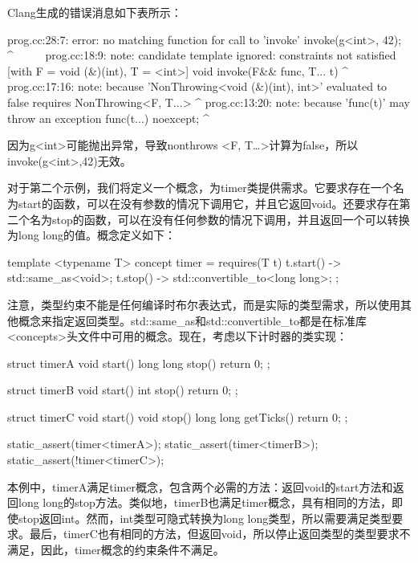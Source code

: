 Clang生成的错误消息如下表所示：

\begin{shell}
prog.cc:28:7: error: no matching function for call to 'invoke'
      invoke(g<int>, 42);
       ^~~~~~
prog.cc:18:9: note: candidate template ignored: constraints not
satisfied [with F = void (&)(int), T = <int>]
   void invoke(F&& func, T... t)
          ^
prog.cc:17:16: note: because 'NonThrowing<void (&)(int), int>'
evaluated to false
      requires NonThrowing<F, T...>
                  ^
prog.cc:13:20: note: because 'func(t)' may throw an exception
      {func(t...)} noexcept;
                       ^
\end{shell}

因为g<int>可能抛出异常，导致nonthrows <F, T…>计算为false，所以invoke(g<int>,42)无效。

对于第二个示例，我们将定义一个概念，为timer类提供需求。它要求存在一个名为start的函数，可以在没有参数的情况下调用它，并且它返回void。还要求存在第二个名为stop的函数，可以在没有任何参数的情况下调用，并且返回一个可以转换为long long的值。概念定义如下：

\begin{cpp}
template <typename T>
concept timer = requires(T t)
{
	{t.start()} -> std::same_as<void>;
	{t.stop()} -> std::convertible_to<long long>;
};
\end{cpp}

注意，类型约束不能是任何编译时布尔表达式，而是实际的类型需求，所以使用其他概念来指定返回类型。std::same\_as和std::convertible\_to都是在标准库<concepts>头文件中可用的概念。现在，考虑以下计时器的类实现：

\begin{cpp}
struct timerA
{
	void start() {}
	long long stop() { return 0; }
};

struct timerB
{
	void start() {}
	int stop() { return 0; }
};

struct timerC
{
	void start() {}
	void stop() {}
	long long getTicks() { return 0; }
};

static_assert(timer<timerA>);
static_assert(timer<timerB>);
static_assert(!timer<timerC>);
\end{cpp}

本例中，timerA满足timer概念，包含两个必需的方法：返回void的start方法和返回long long的stop方法。类似地，timerB也满足timer概念，具有相同的方法，即使stop返回int。然而，int类型可隐式转换为long long类型，所以需要满足类型要求。最后，timerC也有相同的方法，但返回void，所以停止返回类型的类型要求不满足，因此，timer概念的约束条件不满足。

